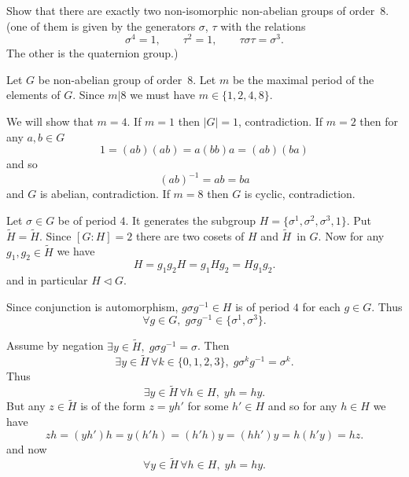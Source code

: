 \documentclass[12pt]{book}
\newcounter{myenumi}
\newenvironment{myenumerate}
{\begin{enumerate}
 \setcounter{enumi}{\themyenumi}
}
{\setcounter{myenumi}{\theenumi}
 \end{enumerate}}
\begin{document}
\begin{myenumerate}
\begin{excopy}
Show that there are exactly two non-isomorphic non-abelian groups of order~$8$.
(one of them is given by the generators \(\sigma\), \(\tau\) with the relations
\begin{equation*}
\sigma^4 = 1, \qquad \tau^2 = 1, \qquad \tau\sigma\tau = \sigma^3.
\end{equation*}
The other is the quaternion group.)
\end{excopy}

Let $G$ be non-abelian group of order~$8$.
Let $m$ be the maximal period of the elements of $G$.
Since \(m|8\) we must have \(m\in\{1,2,4,8\}\).

We will show that \(m=4\).
If \(m=1\) then \(|G|=1\), contradiction.
If \(m=2\) then for any \(a,b\in G\)
\begin{equation*}
1 = (ab)(ab) = a(bb)a = (ab)(ba)
\end{equation*}
and so
\begin{equation*}
(ab)^{-1} = ab = ba
\end{equation*}
and $G$ is abelian, contradiction.
If \(m=8\) then $G$ is cyclic, contradiction.

Let \(\sigma\in G\) be of period $4$. It generates
the subgroup \(H=\{\sigma^1,\sigma^2,\sigma^3,1\}\).
\newcommand{\coH}{\ensuremath{\tilde{H}}}
Put  \(\coH = \coH\).
Since \([G:H]=2\) there are two cosets of $H$ and \coH\ in $G$.
Now for any \(g_1,g_2\in \coH\) we have
\begin{equation} \label{eq:H=g1g2H}
H = g_1 g_2 H = g_1 H g_2 = H g_1 g_2.
\end{equation}
and in particular \(H \triangleleft G\).

Since conjunction is automorphism, \(g\sigma g^{-1} \in H\) is
of period $4$ for each \(g\in G\).
Thus
\begin{equation*}
\forall g\in G,\; g\sigma g^{-1} \in \{\sigma^1,\sigma^3\}.
\end{equation*}

Assume by negation \(\exists y\in \coH,\; g\sigma g^{-1}=\sigma\).
Then
\begin{equation*}
\exists y\in \coH\, \forall k\in\{0,1,2,3\},\; g\sigma^kg^{-1}=\sigma^k.
\end{equation*}
Thus
\begin{equation*}
\exists y\in \coH\, \forall h\in H,\; yh=hy.
\end{equation*}
But any \(z \in \coH\) is of the form \(z = yh'\) for some \(h'\in H\)
and so for any \(h\in H\) we have
\begin{equation*}
zh = (yh')h = y(h'h) = (h'h)y = (hh')y = h(h'y) = hz.
\end{equation*}
and now
\begin{equation*}
\forall y\in \coH\, \forall h\in H,\; yh=hy.
\end{equation*}


\end{myenumerate}
\end{document}

